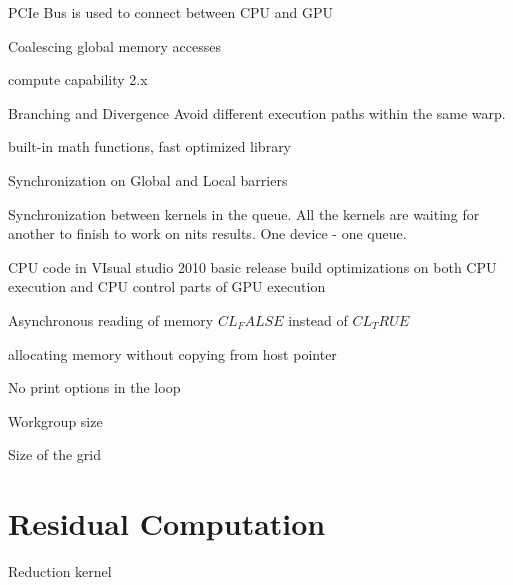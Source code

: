 PCIe Bus is used to connect between CPU and GPU 

Coalescing global memory accesses

compute capability 2.x

Branching and Divergence
Avoid different execution paths within the same warp.


built-in math functions, fast optimized library

Synchronization on Global and Local barriers

Synchronization between kernels in the queue. All the kernels are waiting for another to finish to work on nits results.
One device - one queue.

CPU code in VIsual studio 2010 basic release build optimizations on both CPU execution and CPU control parts of GPU execution

Asynchronous reading of memory $CL_FALSE$ instead of $CL_TRUE$

allocating memory without copying from host pointer

No print options in the loop

Workgroup size

Size of the grid

%
%

\section{Residual Computation}

Reduction kernel




